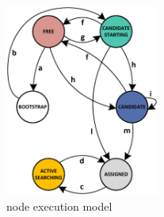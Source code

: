 \begin{figure}
  \centering
    \includegraphics[width=0.45\textwidth]{pictures/dbs_updated.eps}
  \caption{\disr{} node execution model}
  \label{fig:state_machine}
\end{figure}

